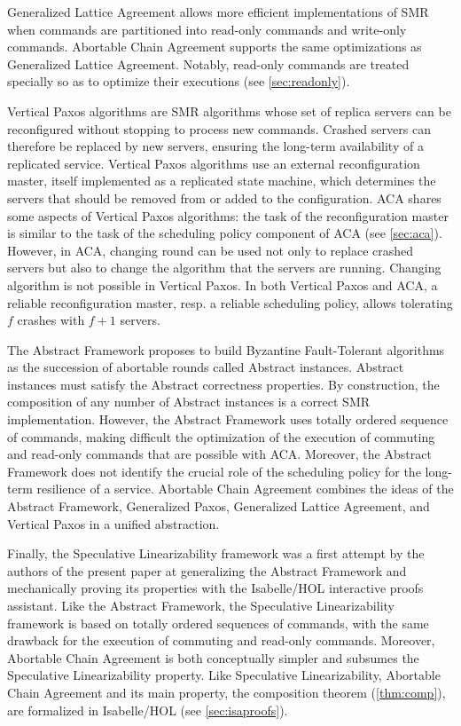 Generalized Lattice Agreement \cite{FalerioETAL12GeneralizedLatticeAgreement} allows more efficient implementations of SMR when
commands are partitioned into read-only commands and write-only commands.
Abortable Chain Agreement supports the same optimizations as Generalized Lattice Agreement.
Notably, read-only commands are treated specially so as to optimize their
executions (see \cref{sec:readonly}).

Vertical Paxos algorithms 
\cite{LamportMalkhiZhou09VerticalPaxosPrimarybackupReplication} are SMR algorithms
whose set of replica servers can be reconfigured without stopping to process new
commands. Crashed servers can therefore be replaced by new servers, ensuring the
long-term availability of a replicated service.
Vertical Paxos algorithms use an external reconfiguration master, itself
implemented as a replicated state machine, which determines the servers that should
be removed from or added to the configuration.
ACA shares some aspects of Vertical Paxos algorithms: the task of the
reconfiguration master is similar to the task of the scheduling policy
component of ACA (see \cref{sec:aca}).
However, in ACA, changing round can be used not only to replace crashed servers
but also to change the algorithm that the servers are running. 
Changing algorithm is not possible in Vertical Paxos.
In both Vertical Paxos and ACA, a reliable reconfiguration master, resp. a
reliable scheduling policy, allows tolerating $f$ crashes with $f+1$ servers.

The Abstract Framework \cite{GuerraouiETAL10Next700BftProtocols} proposes to
build Byzantine Fault-Tolerant algorithms as the succession of abortable rounds
called Abstract instances. Abstract instances must satisfy the Abstract
correctness properties. By construction, the composition of any number of
Abstract instances is a correct SMR implementation. However, the Abstract
Framework uses totally ordered sequence of commands, making difficult the
optimization of the execution of commuting and read-only commands that are
possible with ACA.  Moreover, the Abstract Framework does not identify the
crucial role of the scheduling policy for the long-term resilience of a service.
Abortable Chain Agreement combines the ideas of the Abstract Framework,
Generalized Paxos, Generalized Lattice Agreement, and Vertical Paxos in a
unified abstraction. 

Finally, the Speculative Linearizability framework
\cite{GuerraouiKuncakLosa12SpeculativeLinearizability} was a first
attempt by the authors of the present paper at generalizing the
Abstract Framework and mechanically proving its properties with the
Isabelle/HOL interactive
proofs assistant.  Like the Abstract Framework, the
Speculative Linearizability framework is based on totally ordered
sequences of commands, with the same drawback for the execution of
commuting and read-only commands. Moreover, Abortable Chain Agreement is both
conceptually simpler and subsumes the Speculative Linearizability
property.  Like Speculative Linearizability, Abortable Chain Agreement
and its main property, the composition theorem (\cref{thm:comp}), are
formalized in Isabelle/HOL (see \cref{sec:isaproofs}).

